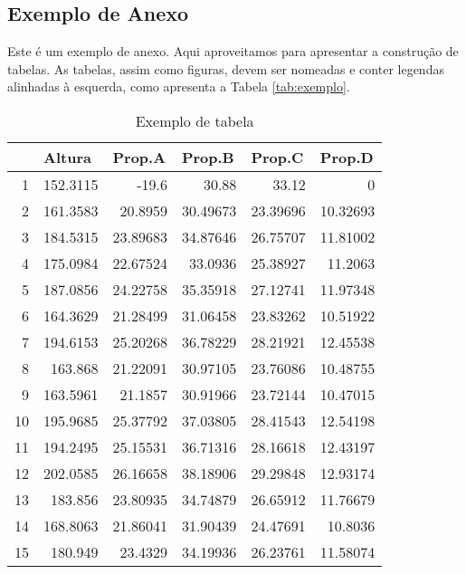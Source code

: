 \begin{anexosenv}

\chapter{Exemplo de Anexo}
\label{cap:anexo}

    Este é um exemplo de anexo. Aqui aproveitamos para apresentar a construção de tabelas. As tabelas, assim como figuras, devem ser nomeadas e conter legendas alinhadas à esquerda, como apresenta a Tabela \ref{tab:exemplo}.

\begin{table}[htbp]
  \centering
  \caption{Exemplo de tabela}
    \begin{tabular}{rrrrrr}
    \toprule
          & \multicolumn{1}{l}{Altura} & \multicolumn{1}{l}{Prop.A} & \multicolumn{1}{l}{Prop.B} & \multicolumn{1}{l}{Prop.C} & \multicolumn{1}{l}{Prop.D} \\
    \midrule
    1     & 152.3115 & -19.6 & 30.88 & 33.12 & 0 \\
    2     & 161.3583 & 20.8959 & 30.49673 & 23.39696 & 10.32693 \\
    3     & 184.5315 & 23.89683 & 34.87646 & 26.75707 & 11.81002 \\
    4     & 175.0984 & 22.67524 & 33.0936 & 25.38927 & 11.2063 \\
    5     & 187.0856 & 24.22758 & 35.35918 & 27.12741 & 11.97348 \\
    6     & 164.3629 & 21.28499 & 31.06458 & 23.83262 & 10.51922 \\
    7     & 194.6153 & 25.20268 & 36.78229 & 28.21921 & 12.45538 \\
    8     & 163.868 & 21.22091 & 30.97105 & 23.76086 & 10.48755 \\
    9     & 163.5961 & 21.1857 & 30.91966 & 23.72144 & 10.47015 \\
    10    & 195.9685 & 25.37792 & 37.03805 & 28.41543 & 12.54198 \\
    11    & 194.2495 & 25.15531 & 36.71316 & 28.16618 & 12.43197 \\
    12    & 202.0585 & 26.16658 & 38.18906 & 29.29848 & 12.93174 \\
    13    & 183.856 & 23.80935 & 34.74879 & 26.65912 & 11.76679 \\
    14    & 168.8063 & 21.86041 & 31.90439 & 24.47691 & 10.8036 \\
    15    & 180.949 & 23.4329 & 34.19936 & 26.23761 & 11.58074 \\

\end{tabular}
\end{table}
\end{anexosenv}
